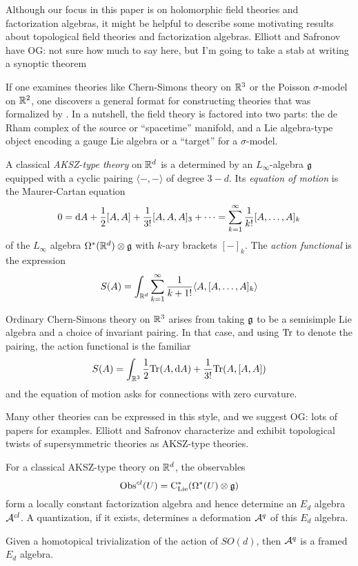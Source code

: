 \documentclass[11pt]{amsart}
\def\owen#1{{\textcolor{violet!65!black}{OG: {#1}}}}
\begin{document}
Although our focus in this paper is on holomorphic field theories and factorization algebras,
it might be helpful to describe some motivating results about topological field theories and factorization algebras.
Elliott and Safronov have \owen{not sure how much to say here, but I'm going to take a stab at writing a synoptic theorem}

If one examines theories like Chern-Simons theory on $\mathbb R^3$ or the Poisson $\sigma$-model on $\mathbb R^2$, 
one discovers a general format for constructing theories that was formalized by \cite{AKSZ}.
In a nutshell, the field theory is factored into two parts: 
the de Rham complex of the source or ``spacetime'' manifold, 
and a Lie algebra-type object encoding a gauge Lie algebra or a ``target'' for a $\sigma$-model.

\begin{dfn}
A classical {\em AKSZ-type theory} on $\mathbb R^d$ is a determined by an $L_\infty$-algebra $\mathfrak g$ equipped with a cyclic pairing $\langle-,-\rangle$ of degree $3-d$.
Its {\em equation of motion} is the Maurer-Cartan equation 
\[
0 = {\rm d} A + \frac{1}{2} [A,A] + \frac{1}{3!}[A,A,A]_3 + \cdots = \sum_{k=1}^\infty \frac{1}{k!} [A, \ldots, A]_k
\]
of the $L_\infty$ algebra $\Omega^*(\mathbb R^d) \otimes \mathfrak g$ with $k$-ary brackets $[-]_k$.
The {\em action functional} is the expression
\[
S(A) = \int_{\mathbb R^d} \sum_{k=1}^\infty \frac{1}{{k+1}!} \langle A, [A, \ldots, A]_k \rangle
\]
\end{dfn}

Ordinary Chern-Simons theory on $\mathbb R^3$ arises from taking $\mathfrak g$ to be a semisimple Lie algebra and a choice of invariant pairing.
In that case, and using ${\rm Tr}$ to denote the pairing, the action functional is the familiar
\[
S(A) = \int_{\mathbb R^3}  \frac{1}{2}{\rm Tr} ( A, {\rm d} A ) + \frac{1}{3!} {\rm Tr}( A, [A, A])
\]
and the equation of motion asks for connections with zero curvature.

Many other theories can be expressed in this style, and we suggest \owen{lots of papers} for examples.
Elliott and Safronov characterize and exhibit topological twists of supersymmetric theories as AKSZ-type theories.

\begin{thm}
For a classical AKSZ-type theory on $\mathbb R^d$, the observables 
\[
{\rm Obs}^{cl}(U) = {\rm C}_{{\rm Lie}}^*(\Omega^*(U) \otimes \mathfrak g)
\]
form a locally constant factorization algebra and hence determine an $E_d$ algebra~$\mathcal A^{cl}$.
A quantization, if it exists, determines a deformation $\mathcal A^q$ of this $E_d$ algebra.

Given a homotopical trivialization of the action of $SO(d)$, then $\mathcal A^q$ is a framed $E_d$ algebra.
\end{thm}
\end{document}
